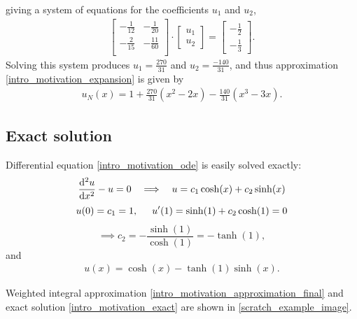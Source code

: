 giving a system of equations for the coefficients $u_1$ and $u_2$,
\begin{align*}
  \begin{bmatrix}
    - \frac{1}{12} & - \frac{1}{20} \\
    - \frac{2}{15} & - \frac{11}{60} \\
  \end{bmatrix} \cdot
  \begin{bmatrix}
    u_1 \\
    u_2
  \end{bmatrix} = 
  \begin{bmatrix}
    -\frac{1}{2} \\
    -\frac{1}{3}
  \end{bmatrix}.
\end{align*}
Solving this system produces $u_1 = \frac{270}{31}$ and $u_2 = \frac{-140}{31}$, and thus approximation \cref{intro_motivation_expansion} is given by
\begin{align}
  \label{intro_motivation_approximation_final}
  u_N(x) = 1 + \frac{270}{31} (x^2 - 2x) - \frac{140}{31} (x^3 - 3x).
\end{align}

\subsection{Exact solution}

Differential equation \cref{intro_motivation_ode} is easily solved exactly:
$$\totder[2]{u}{x} - u = 0 \hspace{2.5mm} \implies \hspace{2.5mm} u = c_1 \cosh(x) + c_2 \sinh(x)$$ 
$$u(0) = c_1 = 1, \hspace{5mm} u'(1) = \sinh(1) + c_2 \cosh(1) = 0$$
$$\implies c_2 = -\frac{\sinh(1)}{\cosh(1)} = -\tanh(1),$$
and 
\begin{align}
  \label{intro_motivation_exact}
  u(x) = \cosh(x) - \tanh(1)\sinh(x).
\end{align}

Weighted integral approximation \cref{intro_motivation_approximation_final} and exact solution \cref{intro_motivation_exact} are shown in \cref{scratch_example_image}.


